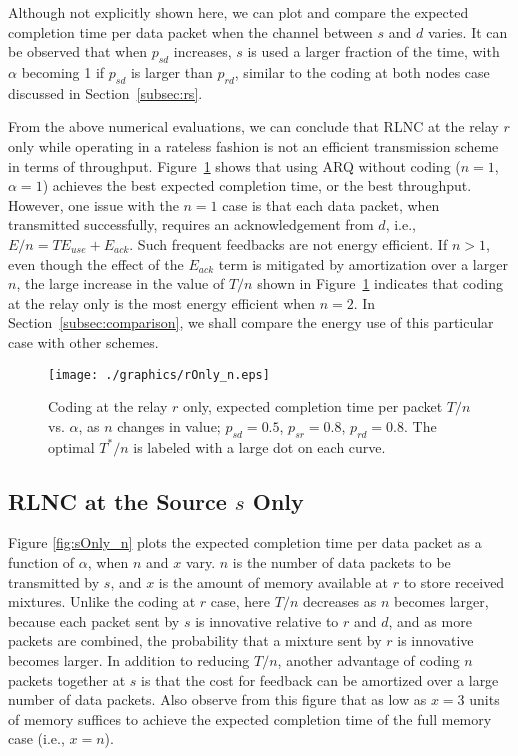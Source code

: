 \documentclass[journal, letterpaper]{IEEEtran}
\begin{document}
Although not explicitly shown here, we can plot and compare the expected completion time per data packet when the channel between $s$ and $d$ varies. It can be observed that when $p_{sd}$ increases, $s$ is used a larger fraction of the time, with $\alpha$ becoming 1 if $p_{sd}$ is larger than $p_{rd}$, similar to the coding at both nodes case discussed in Section~\ref{subsec:rs}.

From the above numerical evaluations, we can conclude that RLNC at the relay $r$ only while operating in a rateless fashion is not an efficient transmission scheme in terms of throughput. Figure~\ref{fig:rOnly_n} shows that using ARQ without coding ($n=1$, $\alpha=1$) achieves the best expected completion time, or the best throughput. However, one issue with the $n=1$ case is that each data packet, when transmitted successfully, requires an acknowledgement from $d$, i.e., $E/n=TE_{use}+E_{ack}$. Such frequent feedbacks are not energy efficient. If $n>1$, even though the effect of the $E_{ack}$ term is mitigated by amortization over a larger $n$, the large increase in the value of $T/n$ shown in Figure~\ref{fig:rOnly_n} indicates that coding at the relay only is the most energy efficient when $n=2$. In Section~\ref{subsec:comparison}, we shall compare the energy use of this particular case with other schemes.

\begin{figure}[t!]
  \centering
  \texttt{[image: ./graphics/rOnly\_n.eps]}
  \caption{Coding at the relay $r$ only, expected completion time per packet $T/n$  vs. $\alpha$, as $n$ changes in value; $p_{sd} = 0.5$, $p_{sr}=0.8$, $p_{rd} =0.8$. The optimal $T^*/n$ is labeled with a large dot on each curve.}
  \label{fig:rOnly_n}
\end{figure}

\subsection{RLNC at the Source $s$ Only}

Figure \ref{fig:sOnly_n} plots the expected completion time per data packet as a function of $\alpha$, when $n$ and $x$ vary. $n$ is the number of data packets to be transmitted by $s$, and $x$ is the amount of memory available at $r$ to store received mixtures. Unlike the coding at $r$ case, here $T/n$ decreases as $n$ becomes larger, because each packet sent by $s$ is innovative relative to $r$ and $d$, and as more packets are combined, the probability that a mixture sent by $r$ is innovative becomes larger. In addition to reducing $T/n$, another advantage of coding $n$ packets together at $s$ is that the cost for feedback can be amortized over a large number of data packets. Also observe from this figure that as low as $x=3$ units of memory suffices to achieve the expected completion time of the full memory case (i.e., $x=n$).
\end{document}
